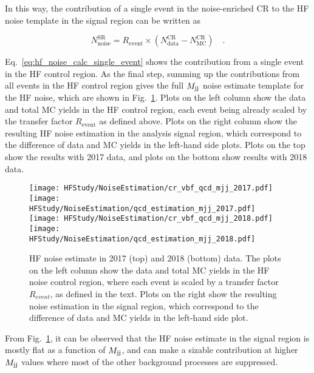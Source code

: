 In this way, the contribution of a single event in the noise-enriched CR to the HF noise template in the signal region can be written as

\begin{equation}
    N_{\textrm{noise}}^{\textrm{SR}} = R_{\textrm{event}} \times (N_{\textrm{data}}^{\textrm{CR}} - N_{\textrm{MC}}^{\textrm{CR}}) \quad .
    \label{eq:hf_noise_calc_single_event}
\end{equation}

Eq.~\ref{eq:hf_noise_calc_single_event} shows the contribution from a single event in the HF control region.
As the final step, summing up the contributions from all events in the HF control region gives the full $M_{\textrm{jj}}$ 
noise estimate template for the HF noise, which are shown in Fig.~\ref{fig:hf_estimation_mtr}.
Plots on the left column show the data and total MC
yields in the HF control region, each event being already scaled by the transfer factor 
$R_{\textrm{event}}$ as defined above. 
Plots on the right column show the resulting HF noise estimation in the analysis
signal region, which correspond to the difference of data and MC yields in the left-hand side plots.
Plots on the top show the results with 2017 data, and plots on the bottom show results with 2018 data.

\begin{figure}[h!]
    \centering
        \texttt{[image: HFStudy/NoiseEstimation/cr\_vbf\_qcd\_mjj\_2017.pdf]}
        \texttt{[image: HFStudy/NoiseEstimation/qcd\_estimation\_mjj\_2017.pdf]} \\ 
        \texttt{[image: HFStudy/NoiseEstimation/cr\_vbf\_qcd\_mjj\_2018.pdf]}
        \texttt{[image: HFStudy/NoiseEstimation/qcd\_estimation\_mjj\_2018.pdf]}
    \caption{HF noise estimate in 2017 (top) and 2018 (bottom) data. The plots on the left column show the data and total MC yields in the HF noise control region,
      where each event is scaled by a transfer factor $R_{event}$, as defined in the text. 
      Plots on the right show the resulting noise estimation in the signal region, which correspond to the difference of data and MC
      yields in the left-hand side plot.
    }
    \label{fig:hf_estimation_mtr}
\end{figure}

From Fig.~\ref{fig:hf_estimation_mtr}, it can be observed that the HF noise estimate in the signal region is mostly
flat as a function of $M_{\textrm{jj}}$, and can make a sizable contribution at higher $M_{\textrm{jj}}$ values where most of the other background
processes are suppressed.

